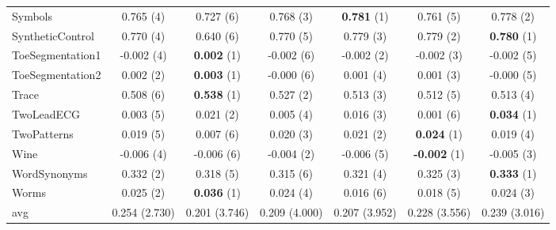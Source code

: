 \begin{table}[ht]
\begin{adjustbox}{width=\textwidth}
\begin{tabular}{lcccccc}
    Symbols & 0.765 (4) & 0.727 (6) & 0.768 (3) & \textbf{0.781} (1) & 0.761 (5) & 0.778 (2) \\
    SyntheticControl & 0.770 (4) & 0.640 (6) & 0.770 (5) & 0.779 (3) & 0.779 (2) & \textbf{0.780} (1) \\
    ToeSegmentation1 & -0.002 (4) & \textbf{0.002} (1) & -0.002 (6) & -0.002 (2) & -0.002 (3) & -0.002 (5) \\
    ToeSegmentation2 & 0.002 (2) & \textbf{0.003} (1) & -0.000 (6) & 0.001 (4) & 0.001 (3) & -0.000 (5) \\
    Trace & 0.508 (6) & \textbf{0.538} (1) & 0.527 (2) & 0.513 (3) & 0.512 (5) & 0.513 (4) \\
    TwoLeadECG & 0.003 (5) & 0.021 (2) & 0.005 (4) & 0.016 (3) & 0.001 (6) & \textbf{0.034} (1) \\
    TwoPatterns & 0.019 (5) & 0.007 (6) & 0.020 (3) & 0.021 (2) & \textbf{0.024} (1) & 0.019 (4) \\
    Wine & -0.006 (4) & -0.006 (6) & -0.004 (2) & -0.006 (5) & \textbf{-0.002} (1) & -0.005 (3) \\
    WordSynonyms & 0.332 (2) & 0.318 (5) & 0.315 (6) & 0.321 (4) & 0.325 (3) & \textbf{0.333} (1) \\
    Worms & 0.025 (2) & \textbf{0.036} (1) & 0.024 (4) & 0.016 (6) & 0.018 (5) & 0.024 (3) \\
    \hline 
    avg & 0.254 (2.730) & 0.201 (3.746) & 0.209 (4.000) & 0.207 (3.952) & 0.228 (3.556) & 0.239 (3.016) \\ 
    \hline
    \end{tabular}
    \end{adjustbox}
    \end{table}
    
    
    
